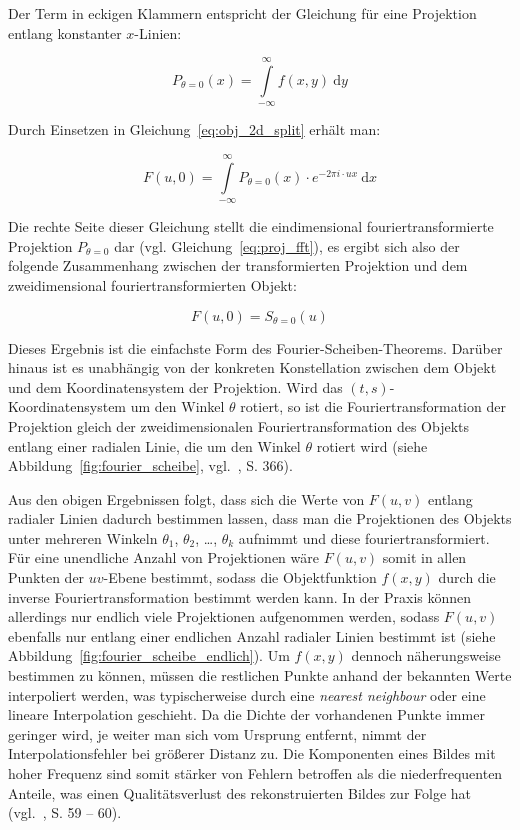 Der Term in eckigen Klammern entspricht der Gleichung für eine Projektion entlang konstanter $x$-Linien:

\begin{equation}
    P_{\theta = 0}(x) = \int\limits_{-\infty}^{\infty} f(x, y)\ \mathrm{d} y
\end{equation}

Durch Einsetzen in Gleichung~\ref{eq:obj_2d_split} erhält man:

\begin{equation}
    F(u, 0) = \int\limits_{-\infty}^{\infty} P_{\theta = 0}(x) \cdot e^{-2 \pi i \cdot u x}\ \mathrm{d} x
\end{equation}

Die rechte Seite dieser Gleichung stellt die eindimensional fouriertransformierte Projektion $P_{\theta = 0}$ dar (vgl.
Gleichung~\ref{eq:proj_fft}), es ergibt sich also der folgende Zusammenhang zwischen der transformierten Projektion und
dem zweidimensional fouriertransformierten Objekt:

\begin{equation}
    F(u, 0) = S_{\theta = 0}(u)
\end{equation}

Dieses Ergebnis ist die einfachste Form des Fourier-Scheiben-Theorems. Darüber hinaus ist es unabhängig von der
konkreten Konstellation zwischen dem Objekt und dem Koordinatensystem der Projektion. Wird das
$(t, s)$-Koordinatensystem um den Winkel $\theta$ rotiert, so ist die Fouriertransformation der Projektion gleich der
zweidimensionalen Fouriertransformation des Objekts entlang einer radialen Linie, die um den Winkel $\theta$ rotiert
wird (siehe Abbildung~\ref{fig:fourier_scheibe}, vgl.~\cite{rosenkak}, S. 366).

Aus den obigen Ergebnissen folgt, dass sich die Werte von $F(u, v)$ entlang radialer Linien dadurch bestimmen lassen,
dass man die Projektionen des Objekts unter mehreren Winkeln $\theta_1$, $\theta_2$, \ldots, $\theta_k$ aufnimmt und
diese fouriertransformiert. Für eine unendliche Anzahl von Projektionen wäre $F(u, v)$ somit in allen Punkten der
$uv$-Ebene bestimmt, sodass die Objektfunktion $f(x, y)$ durch die inverse Fouriertransformation bestimmt werden kann.
In der Praxis können allerdings nur endlich viele Projektionen aufgenommen werden, sodass $F(u, v)$ ebenfalls nur
entlang einer endlichen Anzahl radialer Linien bestimmt ist (siehe Abbildung~\ref{fig:fourier_scheibe_endlich}). Um
$f(x, y)$ dennoch näherungsweise bestimmen zu können, müssen die restlichen Punkte anhand der bekannten Werte
interpoliert werden, was typischerweise durch eine \textit{nearest neighbour} oder eine lineare Interpolation geschieht.
Da die Dichte der vorhandenen Punkte immer geringer wird, je weiter man sich vom Ursprung entfernt, nimmt der
Interpolationsfehler bei größerer Distanz zu. Die Komponenten eines Bildes mit hoher Frequenz sind somit stärker von
Fehlern betroffen als die niederfrequenten Anteile, was einen Qualitätsverlust des rekonstruierten Bildes zur Folge hat
(vgl.~\cite{kakslan}, S. 59 -- 60).

